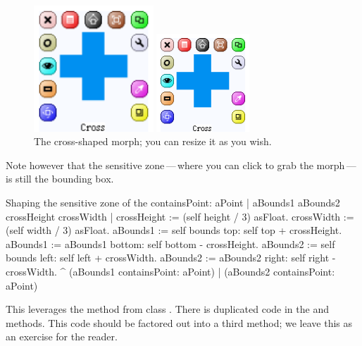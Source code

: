 \documentclass[a4paper,10pt,twoside]{book}
\begin{document}
\begin{figure}[ht]
	\ifluluelse
		{\centerline{\includegraphics[width=0.4\textwidth]{cross}}}
		{\centerline{\includegraphics{cross}}}
	\caption{The cross-shaped morph; you can resize it as you wish.
		\label{fig:cross}}
\end{figure}

Note however that the sensitive zone\,---\,where you can click to grab the morph\,---\,is still the bounding box.


\begin{method}{Shaping the sensitive zone of the }
containsPoint: aPoint
   | aBounds1 aBounds2 crossHeight crossWidth |
   crossHeight := (self height / 3) asFloat.
   crossWidth := (self width / 3) asFloat.
   aBounds1 := self bounds top: self top + crossHeight.
   aBounds1 := aBounds1 bottom: self bottom - crossHeight.
   aBounds2 := self bounds left: self left + crossWidth.
   aBounds2 := aBounds2 right: self right - crossWidth.
   ^ (aBounds1 containsPoint: aPoint)
      | (aBounds2 containsPoint: aPoint)
\end{method}

This leverages the  method from class .
There is duplicated code in the  and  methods.
This code should be factored out into a third method; we leave this as an exercise for the reader.
\end{document}
